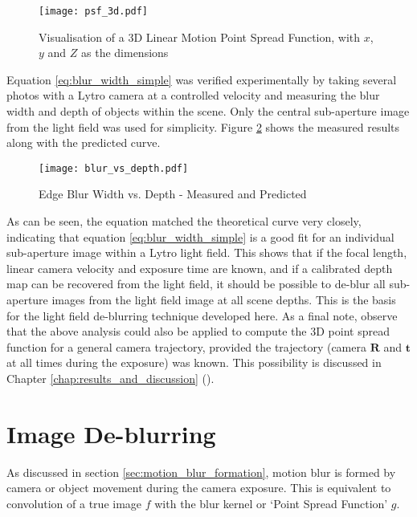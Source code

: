 \begin{figure}[h]
\centering
\texttt{[image: psf\_3d.pdf]}
\caption[Visualisation of a 3D Point Spread Function]{Visualisation of a 3D Linear Motion Point Spread Function, with $x$, $y$ and $Z$ as the dimensions}
\label{fig:psf_3d}
\end{figure}

Equation \ref{eq:blur_width_simple} was verified experimentally by taking several photos with a Lytro camera at a controlled velocity and measuring the blur width and depth of objects within the scene.
Only the central sub-aperture image from the light field was used for simplicity.
Figure \ref{fig:blur_vs_depth} shows the measured results along with the predicted curve.

\begin{figure}[h]
\centering
\caption[Edge Blur Width vs. Depth]{Edge Blur Width vs. Depth - Measured and Predicted}
\label{fig:blur_vs_depth}
\texttt{[image: blur\_vs\_depth.pdf]}
\end{figure}

As can be seen, the equation matched the theoretical curve very closely, indicating that equation \ref{eq:blur_width_simple} is a good fit for an individual sub-aperture image within a Lytro light field.
This shows that if the focal length, linear camera velocity and exposure time are known, and if a calibrated depth map can be recovered from the light field, it should be possible to de-blur all sub-aperture images from the light field image at all scene depths.
This is the basis for the light field de-blurring technique developed here.
As a final note, observe that the above analysis could also be applied to compute the 3D point spread function for a general camera trajectory, provided the trajectory (camera $\boldsymbol{R}$ and $\boldsymbol{t}$ at all times during the exposure) was known.
This possibility is discussed in Chapter \ref{chap:results_and_discussion} ().


\section{Image De-blurring}
\label{sec:image_deblurring}

As discussed in section \ref{sec:motion_blur_formation}, motion blur is formed by camera or object movement during the camera exposure.
This is equivalent to convolution of a true image $f$ with the blur kernel or \enquote*{Point Spread Function} $g$.

